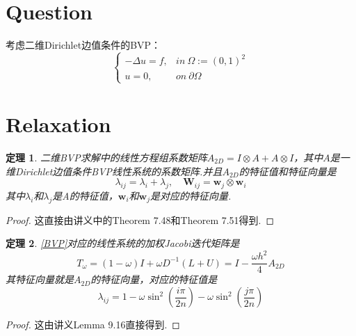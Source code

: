 \documentclass[a4paper,11.5pt,UTF8]{ctexart}
\newtheorem{thm}{定理}[section]
\begin{document}
\begin{large}
	
\section{Question}
\par 考虑二维Dirichlet边值条件的BVP：
\begin{equation}
	\begin{cases}
		-\Delta u = f, & in\ \Omega:=(0,1)^2 \\
		u = 0, & on\ \partial\Omega
	\end{cases}
	\label{BVP}
\end{equation}

	
\section{Relaxation}
\begin{thm}
	二维BVP求解中的线性方程组系数矩阵$A_{2D} = I\otimes A + A\otimes I$，其中$A$是一维Dirichlet边值条件BVP线性系统的系数矩阵.并且$A_{2D}$的特征值和特征向量是
	$$\lambda_{ij}=\lambda_i+\lambda_j,\quad \mathbf{W}_{ij}=\mathbf{w}_j\otimes\mathbf{w}_i$$
	其中$\lambda_i$和$\lambda_j$是A的特征值，$\mathbf{w}_i$和$\mathbf{w}_j$是对应的特征向量.
\end{thm}
\begin{proof}
	这直接由讲义中的Theorem 7.48和Theorem 7.51得到.
\end{proof}

\begin{thm}
	\eqref{BVP}对应的线性系统的加权Jacobi迭代矩阵是
	$$T_{\omega} = (1-\omega)I+\omega D^{-1}(L+U) = I-\frac{\omega h^2}{4}A_{2D}$$
	其特征向量就是$A_{2D}$的特征向量，对应的特征值是
	$$\lambda_{ij} = 1-\omega\sin^2(\frac{i\pi}{2n})-\omega\sin^2(\frac{j\pi}{2n})$$
\end{thm}
\begin{proof}
	这由讲义Lemma 9.16直接得到.
\end{proof}


\end{large}
\end{document}
